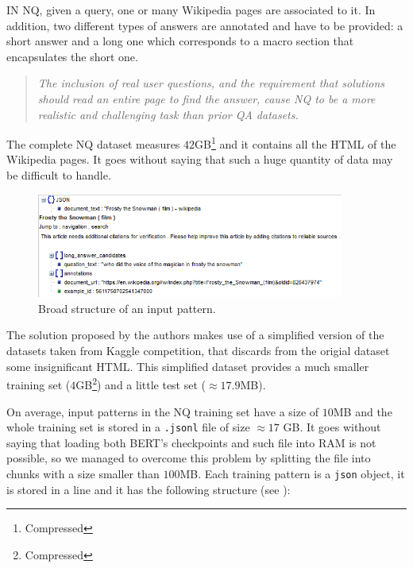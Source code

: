 \documentclass[10pt,hidelinks]{article}
\begin{document}
IN NQ, given a query, one or many Wikipedia pages are associated to it.
In addition, two different types of answers are annotated and have to be provided: a short answer and a long one which corresponds to a macro section that encapsulates the short one.

\blockquote{\it The inclusion of real user questions, and the requirement that solutions should read an entire page to find the answer, cause NQ to be a more realistic and challenging task than prior QA datasets.} \cite{naturalQuestion}

The complete NQ dataset measures $42$GB\footnote{Compressed} and it contains all the HTML of the Wikipedia pages.
It goes without saying that such a huge quantity of data may be difficult to handle.

\begin{figure}[htb]
	\centering
	\includegraphics[width=0.9\textwidth]{report/pics/jsonNEW.png}
	\caption{Broad structure of an input pattern.}\label{fig:json}
\end{figure}

The solution proposed by the authors makes use of a simplified version of the datasets taken from Kaggle competition, that discards from the origial dataset some insignificant HTML. 
This simplified dataset provides a much smaller training set ($4$GB\footnote{Compressed}) and a little test set ($\approx 17.9$MB).

On average, input patterns in the NQ training set have a size of $10$MB and the whole training set is stored in a \texttt{.jsonl} file of size $\approx 17$ GB.
It goes without saying that loading both BERT's checkpoints and such file into RAM is not possible, so we managed to overcome this problem by splitting the file into chunks with a size smaller than $100$MB.
Each training pattern is a \texttt{json} object, it is stored in a line and it has the following structure (see ):
\end{document}
